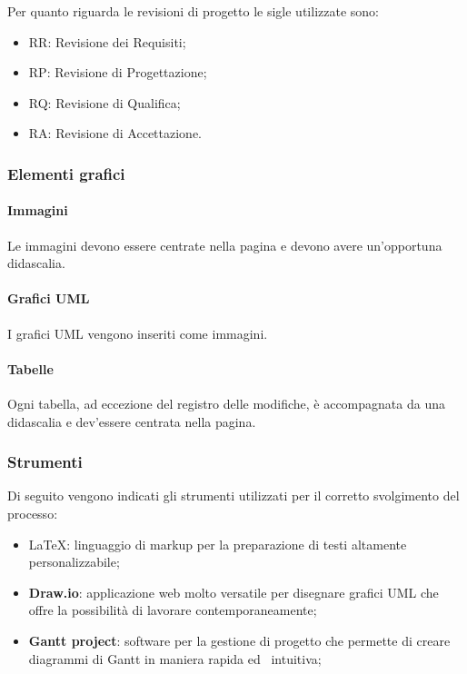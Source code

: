Per quanto riguarda le revisioni di progetto le sigle utilizzate sono:
\begin{itemize}
    \item RR: Revisione dei Requisiti;
    \item RP: Revisione di Progettazione;
    \item RQ: Revisione di Qualifica;
    \item RA: Revisione di Accettazione.
\end{itemize}

\subsubsection{Elementi grafici}
\label{ssub:elementi_grafici}

\paragraph{Immagini}
\label{par:immagini}

Le immagini devono essere centrate nella pagina e devono avere un'opportuna didascalia.

\paragraph{Grafici UML}
\label{par:uml}

I grafici UML vengono inseriti come immagini.

\paragraph{Tabelle}
\label{par:tabelle}

Ogni tabella, ad eccezione del registro delle modifiche, è accompagnata da una didascalia e dev'essere centrata nella 
pagina.

\subsubsection{Strumenti}
\label{ssub:strumenti}

Di seguito vengono indicati gli strumenti utilizzati per il corretto svolgimento del processo:
\begin{itemize}
	\item \LaTeX: linguaggio di markup per la preparazione di testi altamente personalizzabile;
	\item \textbf{Draw.io}: applicazione web molto versatile per disegnare grafici UML che offre la possibilità di lavorare 
		contemporaneamente;
	\item \textbf{Gantt project}: software per la gestione di progetto che permette di creare diagrammi di Gantt in maniera rapida ed \
		intuitiva;
\end{itemize}

